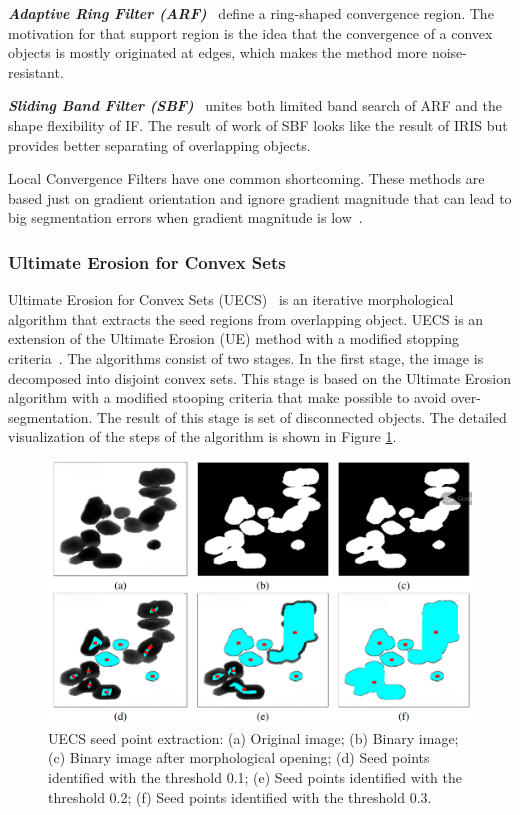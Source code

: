 \documentclass{lutmscthesis}[2010/09/22]
\begin{document}
\textit{\textbf{Adaptive Ring Filter (ARF)}}~\cite{LCF-ARF} define a ring-shaped convergence region. The motivation for that support
region is the idea that the convergence of a convex
objects is mostly originated at edges, which makes the method more noise-resistant.


\textbf{\textit{Sliding Band Filter (SBF)}}~\cite{LCF-SBF} unites both limited band search of ARF and the shape flexibility of IF. 
The result of work of SBF looks like the result of IRIS but provides better separating of overlapping objects.


Local Convergence Filters have one common shortcoming. These methods are based just on gradient orientation and ignore gradient magnitude that can lead to big segmentation errors when gradient magnitude
is low~\cite{LCF}. 



\subsubsection{Ultimate Erosion for Convex Sets}

Ultimate Erosion for Convex Sets (UECS)~\cite{UECS} is an iterative morphological algorithm that extracts
the seed regions from overlapping object. UECS is an extension of the Ultimate Erosion
(UE) method with a modified stopping criteria~\cite{UECS}. The algorithms consist of two stages. In the first stage, the image is decomposed into disjoint convex sets. This stage is based on the Ultimate Erosion algorithm with a modified stooping criteria that make possible to avoid over-segmentation. The result of this stage is set of disconnected objects.
The detailed visualization of the steps of the algorithm is shown in Figure \ref{fig:UECS-alg}.

\begin{figure} [ht]
  \includegraphics[width=\linewidth]{UECS.png}
  \caption{UECS seed point extraction: (a) Original image; 
    (b) Binary image; 
    (c) Binary image after morphological opening; 
    (d) Seed points identified with the threshold 0.1;
    (e) Seed points identified with the threshold 0.2;
    (f) Seed points identified with the threshold 0.3.~\cite{zafari-thesis}}
  \label{fig:UECS-alg}
\end{figure}
\end{document}
